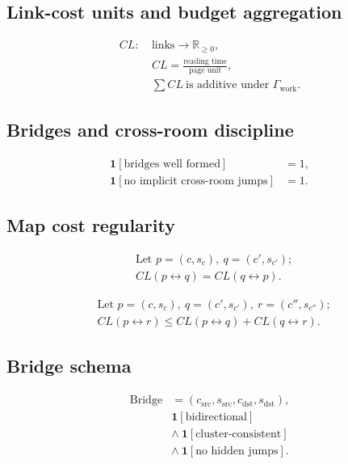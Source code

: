 \documentclass[conference]{IEEEtran}
\begin{document}
\subsection{Link-cost units and budget aggregation}
\begin{equation}\label{eq:cl-units}
\begin{aligned}
CL:\ &\text{links}\to \mathbb{R}_{\ge 0},\\
&CL=\tfrac{\text{reading time}}{\text{page unit}},\\
&\sum CL\ \text{is additive under }\Gamma_{\mathrm{work}}.
\end{aligned}
\end{equation}

\subsection{Bridges and cross-room discipline}
\begin{equation}\label{eq:f-bridges}
\begin{aligned}
\mathbf{1}[\text{bridges well formed}]&=1,\\
\mathbf{1}[\text{no implicit cross-room jumps}]&=1.
\end{aligned}
\end{equation}

\subsection{Map cost regularity}
\begin{equation}\label{eq:cl-sym}
\begin{aligned}
&\text{Let } p=(c,s_c),\ q=(c',s_{c'});\\
&CL(p\leftrightarrow q)=CL(q\leftrightarrow p).
\end{aligned}
\end{equation}

\begin{equation}\label{eq:cl-tri}
\begin{aligned}
&\text{Let } p=(c,s_c),\ q=(c',s_{c'}),\ r=(c'',s_{c''});\\
&CL(p\leftrightarrow r)\le CL(p\leftrightarrow q)+CL(q\leftrightarrow r).
\end{aligned}
\end{equation}

\subsection{Bridge schema}
\begin{equation}
\label{eq:bridge-schema}
\begin{aligned}
\mathrm{Bridge}&=(c_{\mathrm{src}},s_{\mathrm{src}},c_{\mathrm{dst}},s_{\mathrm{dst}}),\\
&\mathbf{1}[\text{bidirectional}]\\
&\wedge\ \mathbf{1}[\text{cluster-consistent}]\\
&\wedge\ \mathbf{1}[\text{no hidden jumps}].
\end{aligned}
\end{equation}
\end{document}
